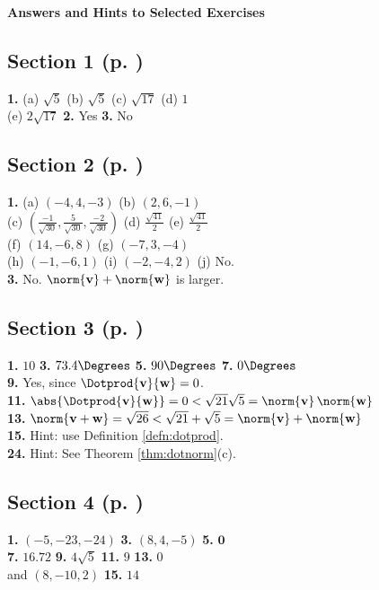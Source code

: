 \textsf{\textbf{\Large Answers and Hints to Selected Exercises}}
\begin{multicols}{2}

\subsection*{Section 1 (p. \pageref{ssec1dot1})}
\textbf{1.} (a) $\sqrt{5}$ \quad (b) $\sqrt{5}$ \quad (c) $\sqrt{17}$ \quad (d) $1$\\(e) $2 \sqrt{17}$ \quad \textbf{2.}
Yes \quad \textbf{3.} No
\subsection*{Section 2 (p. \pageref{ssec1dot2})}
\textbf{1.} (a) $(-4,4,-3)$ \quad (b) $(2,6,-1)$\\(c) $\left ( \frac{-1}{\sqrt{30}},\frac{5}{\sqrt{30}},
\frac{-2}{\sqrt{30}}\right )$ \quad (d) $\frac{\sqrt{41}}{2}$ \quad (e) $\frac{\sqrt{41}}{2}$\\(f) $(14,-6,8)$ \quad
(g) $(-7,3,-4)$\\(h) $(-1,-6,1)$ \quad (i) $(-2,-4,2)$ \quad (j) No.\\\textbf{3.} No. $\norm{\textbf{v}} +
\norm{\textbf{w}}$ is larger.
\subsection*{Section 3 (p. \pageref{ssec1dot3})}
\textbf{1.} $10$ \quad \textbf{3.} $73.4\Degrees$ \quad \textbf{5.} $90\Degrees$ \quad \textbf{7.} $0\Degrees$\\
\textbf{9.} Yes, since $\Dotprod{\textbf{v}}{\textbf{w}} = 0$.\\\textbf{11.} $\abs{\Dotprod{\textbf{v}}{\textbf{w}}} =
0 < \sqrt{21}\sqrt{5} = \norm{\textbf{v}}\,\norm{\textbf{w}}$\\\textbf{13.} $\norm{\textbf{v} + \textbf{w}} = \sqrt{26}
< \sqrt{21} + \sqrt{5} = \norm{\textbf{v}} + \norm{\textbf{w}}$\\\textbf{15.} Hint: use Definition
\ref{defn:dotprod}.\\
\textbf{24.} Hint: See Theorem \ref{thm:dotnorm}(c).
\subsection*{Section 4 (p. \pageref{ssec1dot4})}
\textbf{1.} $(-5,-23,-24)$ \quad \textbf{3.} $(8,4,-5)$ \quad \textbf{5.} $\textbf{0}$\\\textbf{7.} $16.72$ \quad
\textbf{9.} $4\sqrt{5}$ \quad \textbf{11.} $9$ \quad \textbf{13.} $0$\\and $(8,-10,2)$ \quad \textbf{15.} $14$

\end{multicols}
